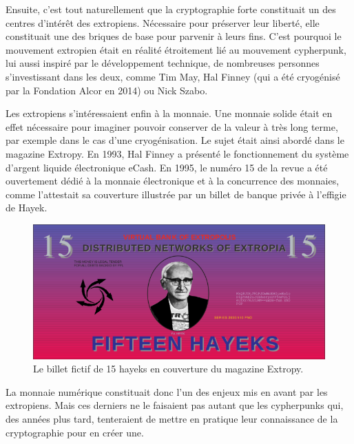 Ensuite, c'est tout naturellement que la cryptographie forte constituait un des centres d'intérêt des extropiens. Nécessaire pour préserver leur liberté, elle constituait une des briques de base pour parvenir à leurs fins. C'est pourquoi le mouvement extropien était en réalité étroitement lié au mouvement cypherpunk, lui aussi inspiré par le développement technique, de nombreuses personnes s'investissant dans les deux, comme Tim May, Hal Finney (qui a été cryogénisé par la Fondation Alcor en 2014) ou Nick Szabo.

Les extropiens s'intéressaient enfin à la monnaie. Une monnaie solide était en effet nécessaire pour imaginer pouvoir conserver de la valeur à très long terme, par exemple dans le cas d'une cryogénisation. Le sujet était ainsi abordé dans le magazine Extropy. En 1993, Hal Finney a présenté le fonctionnement du système d'argent liquide électronique eCash. En 1995, le numéro 15 de la revue a été ouvertement dédié à la monnaie électronique et à la concurrence des monnaies, comme l'attestait sa couverture illustrée par un billet de banque privée à l'effigie de Hayek.

\begin{figure}[h]
  \centering
  \includegraphics[scale=0.8]{img/fifteen-hayeks-note-extropy-15.png}
  \caption{Le billet fictif de 15 hayeks en couverture du magazine Extropy.}
\end{figure}

La monnaie numérique constituait donc l'un des enjeux mis en avant par les extropiens. Mais ces derniers ne le faisaient pas autant que les cypherpunks qui, des années plus tard, tenteraient de mettre en pratique leur connaissance de la cryptographie pour en créer une.

